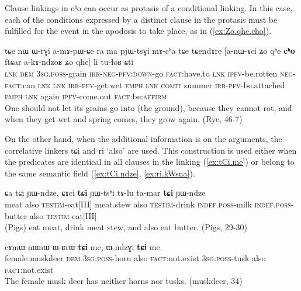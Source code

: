 \documentclass[oldfontcommands,oneside,a4paper,11pt]{article}
\newcommand{\ipa}[1]{{\phon \mbox{#1}}} %
\newcommand{\refb}[1]{(\ref{#1})}
\begin{document}
Clause linkings in \ipa{cʰo} can occur as protasis of a conditional linking. In this case, each of the conditions expressed by a distinct clause in the protasis must be fulfilled for the event in the apodosis to take place, as in \refb{ex:Zo.qhe.cho}.

\begin{exe}
\ex \label{ex:Zo.qhe.cho}
\gll
\ipa{tɕe}  	\ipa{nɯ}  	\ipa{ɯ-rɣi}  	\ipa{a-mɤ-pɯ-ɕe}  	\ipa{ra}  	\ipa{ma}  	\ipa{pjɯ-tsɣi}  	\ipa{mɤ-cʰa}  	\ipa{tɕe}  \ipa{tɕendɤre}  	[\ipa{a-nɯ-ɤci}  	\ipa{ʑo}  	\ipa{qʰe}  	\ipa{\textbf{cʰo}}  	\ipa{ftɕar}  	\ipa{a-kɤ-ndzoʁ}  	\ipa{ʑo}  	\ipa{qhe}]  	\ipa{li}  	\ipa{tu-ɬoʁ}  	\ipa{ɕti}  \\
\textsc{lnk} \textsc{dem} \textsc{3sg.poss}-grain \textsc{irr-neg-pfv:down}-go \textsc{fact}:have.to \textsc{lnk} \textsc{ipfv}-be.rotten \textsc{neg-fact}:can \textsc{lnk} \textsc{lnk} \textsc{irr-pfv}-get.wet \textsc{emph} \textsc{lnk} \textsc{comit} summer \textsc{irr-pfv}-be.attached \textsc{emph} \textsc{lnk} again \textsc{ipfv}-come.out \textsc{fact}:be:\textsc{affirm}\\
\glt One should not let its grains go into (the ground), because they cannot rot, and when they get wet and   spring comes, they grow again. (Rye, 46-7)
\end{exe}




On the other hand, when the additional information is on the arguments, the correlative linkers \ipa{tɕi} and \ipa{ri} `also' are used. This construction is used either when the predicates are identical in all clauses in the linking \refb{ex:tCi.me} or belong to the same semantic field (\ref{ex:tCi.ndze}, \ref{ex:ri.kWsna}).

 \begin{exe}
\ex \label{ex:tCi.ndze}
\gll
\ipa{ɕa}  	\ipa{tɕi}  	\ipa{ɲɯ-ndze,}  	\ipa{ɕɤci}  	\ipa{\textbf{tɕi}}  	\ipa{ɲɯ-tsʰi}  	\ipa{tɤ-lu}  	\ipa{ta-mar}  	\ipa{\textbf{tɕi}}  	\ipa{ɲɯ-ndze}  \\
meat also \textsc{testim}-eat[III] meat.stew also \textsc{testim}-drink  \textsc{indef.poss}-milk \textsc{indef.poss}-butter also \textsc{testim}-eat[III] \\
\glt  (Pigs) eat meat, drink meat stew, and also eat butter. (Pigs, 29-30)
\end{exe}


 \begin{exe}
\ex \label{ex:tCi.me}
\gll
\ipa{cɤmɯ}  	\ipa{nɯnɯ}  	\ipa{ɯ-ʁrɯ}  	\ipa{\textbf{tɕi}}  	\ipa{me,}  	\ipa{ɯ-ndzɣi}  	\ipa{\textbf{tɕi}}  	\ipa{me.}  \\
female.muskdeer \textsc{dem} \textsc{3sg.poss}-horn also \textsc{fact}:not.exist \textsc{3sg.poss}-tusk also \textsc{fact}:not.exist \\
\glt The female musk deer has neither horns nor tusks.  (muskdeer, 34)
\end{exe}
\end{document}
